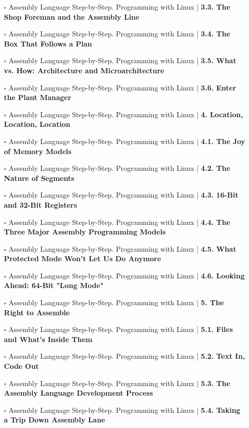 \documentclass[a4, landscape, 12pt]{article}
\newcommand{\checkbox}{$\square$}%
\begin{document}
\begin{itemize}
{}
\item [\checkbox]  Assembly Language Step-by-Step. Programming with Linux | \textbf{ 3.3. The Shop Foreman and the Assembly Line
}
\item [\checkbox]  Assembly Language Step-by-Step. Programming with Linux | \textbf{ 3.4. The Box That Follows a Plan
}
\item [\checkbox]  Assembly Language Step-by-Step. Programming with Linux | \textbf{ 3.5. What vs. How: Architecture and Microarchitecture
}
\item [\checkbox]  Assembly Language Step-by-Step. Programming with Linux | \textbf{ 3.6. Enter the Plant Manager
}
\item [\checkbox]  Assembly Language Step-by-Step. Programming with Linux | \textbf{ 4. Location, Location, Location
}
\item [\checkbox]  Assembly Language Step-by-Step. Programming with Linux | \textbf{ 4.1. The Joy of Memory Models
}
\item [\checkbox]  Assembly Language Step-by-Step. Programming with Linux | \textbf{ 4.2. The Nature of Segments
}
\item [\checkbox]  Assembly Language Step-by-Step. Programming with Linux | \textbf{ 4.3. 16-Bit and 32-Bit Registers
}
\item [\checkbox]  Assembly Language Step-by-Step. Programming with Linux | \textbf{ 4.4. The Three Major Assembly Programming Models
}
\item [\checkbox]  Assembly Language Step-by-Step. Programming with Linux | \textbf{ 4.5. What Protected Mode Won't Let Us Do Anymore
}
\item [\checkbox]  Assembly Language Step-by-Step. Programming with Linux | \textbf{ 4.6. Looking Ahead: 64-Bit "Long Mode"
}
\item [\checkbox]  Assembly Language Step-by-Step. Programming with Linux | \textbf{ 5. The Right to Assemble
}
\item [\checkbox]  Assembly Language Step-by-Step. Programming with Linux | \textbf{ 5.1. Files and What's Inside Them
}
\item [\checkbox]  Assembly Language Step-by-Step. Programming with Linux | \textbf{ 5.2. Text In, Code Out
}
\item [\checkbox]  Assembly Language Step-by-Step. Programming with Linux | \textbf{ 5.3. The Assembly Language Development Process
}
\item [\checkbox]  Assembly Language Step-by-Step. Programming with Linux | \textbf{ 5.4. Taking a Trip Down Assembly Lane
}
\end{itemize}
\end{document}
